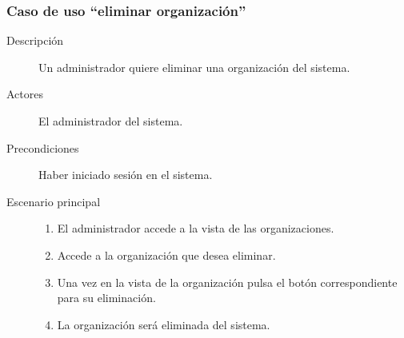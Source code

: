 \subsubsection{Caso de uso ``eliminar organización''}
\begin{description}
\item[Descripción]  Un administrador quiere eliminar una organización del sistema.
\item[Actores]  El administrador del sistema.
\item[Precondiciones]  Haber iniciado sesión en el sistema.
\item[Escenario principal]	\hfill
							\begin{enumerate}
							\item El administrador accede a la vista de las organizaciones.
							\item Accede a la organización que desea eliminar.
							\item Una vez en la vista de la organización pulsa el botón correspondiente para su eliminación.
							\item La organización será eliminada del sistema.
							\end{enumerate}
\end{description}